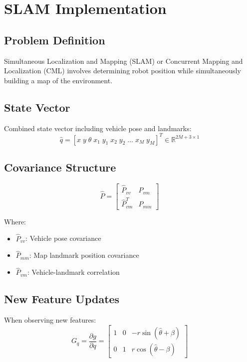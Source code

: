\documentclass[openany]{book}
\theoremstyle{definition}
\theoremstyle{remark}
\newcommand{\definitionbox}[1]{
\begin{tcolorbox}[colback=blue!5,colframe=blue!40!black,title=Definition]
 #1
\end{tcolorbox}
}
\begin{document}
\section{SLAM Implementation}

\subsection{Problem Definition}
\definitionbox{Simultaneous Localization and Mapping (SLAM) or Concurrent Mapping and Localization (CML) involves determining robot position while simultaneously building a map of the environment.}

\subsection{State Vector}
Combined state vector including vehicle pose and landmarks:
\begin{equation}
   \hat{q} = [x \; y \; \theta \; x_1 \; y_1 \; x_2 \; y_2 \; \ldots \; x_M \; y_M]^T \in \mathbb{R}^{2M+3\times1}
\end{equation}

\subsection{Covariance Structure}
\begin{equation}
   \hat{P} = \begin{bmatrix}
       \hat{P}_{vv} & \hat{P}_{vm} \\
       \hat{P}_{vm}^T & \hat{P}_{mm}
   \end{bmatrix}
\end{equation}

Where:
\begin{itemize}
   \item $\hat{P}_{vv}$: Vehicle pose covariance
   \item $\hat{P}_{mm}$: Map landmark position covariance
   \item $\hat{P}_{vm}$: Vehicle-landmark correlation
\end{itemize}

\subsection{New Feature Updates}
When observing new features:
\begin{equation}
   G_q = \frac{\partial g}{\partial q} = \begin{bmatrix}
       1 & 0 & -r\sin(\hat{\theta} + \beta) \\
       0 & 1 & r\cos(\hat{\theta} - \beta)
   \end{bmatrix}
\end{equation}
\end{document}
